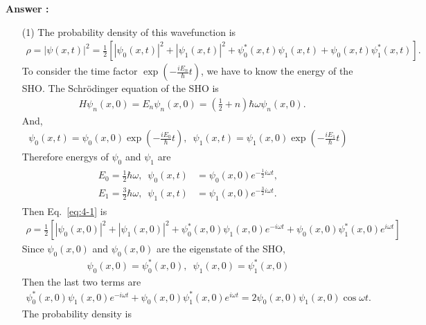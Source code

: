 \documentclass[floatfix,nofootinbib,superscriptaddress,fleqn]{revtex4-2}
\begin{document}
\noindent \textbf{Answer : }
\begin{itemize}
  \item[(1)] The probability density of this wavefunction is
  \begin{align}\label{eq:4-1}
    \rho = |\psi(x,t)|^2 =\frac{1}{2}\left[
      |\psi_0(x,t)|^2+|\psi_1(x,t)|^2+\psi_0^*(x,t)
      \psi_1(x,t)+\psi_0(x,t)\psi_1^*(x,t)
    \right].
  \end{align}
  To consider the time factor $\exp{\left(-\frac{iE_n}{\hbar}t\right)}$, 
  we have to know the energy of the SHO.
  The Schr\"odinger equation of the SHO is
  \begin{align}\label{eq:4-2}
      &H\psi_n(x,0)=E_n\psi_n(x,0)=\left(\frac{1}{2}+n\right)
      \hbar\omega\psi_n(x,0).
  \end{align}
  And,
  \begin{align}%
    \psi_0(x,t) = \psi_0(x,0)\exp{\left(-\frac{iE_0}{\hbar}t\right)},\,\,\,
    \psi_1(x,t) = \psi_1(x,0)\exp{\left(-\frac{iE_1}{\hbar}t\right)}
  \end{align}
  Therefore energys of $\psi_0$ and $\psi_1$ are
  \begin{align}
    \begin{split}\label{eq:4-4}
      E_0 = \frac{1}{2}\hbar\omega,\,\,\,\psi_0(x,t)
      &=\psi_0(x,0)e^{-\frac{1}{2}i\omega t},  \\
      E_1 = \frac{3}{2}\hbar\omega,\,\,\,\psi_1(x,t)
      &=\psi_1(x,0)e^{-\frac{3}{2}i\omega t}.
    \end{split}
  \end{align}
  Then Eq.~\eqref{eq:4-1} is
  \begin{align}%
    \rho =\frac{1}{2}\left[
      |\psi_0(x,0)|^2+|\psi_1(x,0)|^2+\psi_0^*(x,0)\psi_1(x,0)e^{-i\omega t}
      +\psi_0(x,0)\psi_1^*(x,0)e^{i\omega t}
    \right]
  \end{align}
  Since $\psi_0(x,0)$ and $\psi_0(x,0)$ are the eigenstate of the SHO,
  \begin{align}\label{eq:4-6}
    \psi_0(x,0)=\psi_0^*(x,0),\,\,\,\psi_1(x,0)=\psi_1^*(x,0)
  \end{align}
  Then the last two terms are
  \begin{align}%
    \psi_0^*(x,0)\psi_1(x,0)e^{-i\omega t}
      +\psi_0(x,0)\psi_1^*(x,0)e^{i\omega t}
      =2\psi_0(x,0)\psi_1(x,0)\cos{\omega t}.
  \end{align}
  The probability density is
  \begin{align}\label{eq:4-8}

\end{align}
\end{itemize}
\end{document}
